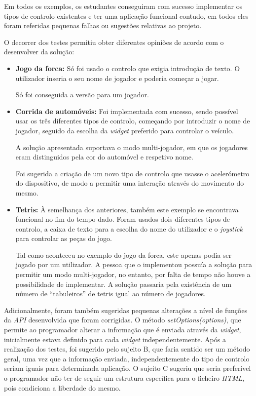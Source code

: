 	Em todos os exemplos, os estudantes conseguiram com sucesso implementar os tipos de controlo existentes e ter uma aplicação funcional contudo, em todos eles foram referidas pequenas falhas ou sugestões relativas ao projeto.

	O decorrer dos testes permitiu obter diferentes opiniões de acordo com o desenvolver da solução:

		\begin{itemize}
		\item \textbf{Jogo da forca: } Só foi usado o controlo que exigia introdução de texto. O utilizador inseria o seu nome de jogador e poderia começar a jogar.

		Só foi conseguida a versão para um jogador.

		\item \textbf{Corrida de automóveis: } Foi implementada com sucesso, sendo possível usar os três diferentes tipos de controlo, começando por introduzir o nome de jogador, seguido da escolha da \textit{widget} preferido para controlar o veículo.

		A solução apresentada suportava o modo multi-jogador, em que os jogadores eram distinguidos pela cor do automóvel e respetivo nome.

		Foi sugerida a criação de um novo tipo de controlo que usasse o acelerómetro do dispositivo, de modo a permitir uma interação através do movimento do mesmo.

		\item \textbf{Tetris: } À semelhança dos anteriores, também este exemplo se encontrava funcional no fim do tempo dado. Foram usados dois diferentes tipos de controlo, a caixa de texto para a escolha do nome do utilizador e o \textit{joystick} para controlar as peças do jogo. 

		Tal como aconteceu no exemplo do jogo da forca, este apenas podia ser jogado por um utilizador. A pessoa que o implementou possuía a solução para permitir um modo multi-jogador, no entanto, por falta de tempo não houve a possibilidade de implementar. A solução passaria pela existência de um número de ``tabuleiros'' de tetris igual ao número de jogadores.

		\end{itemize}

	Adicionalmente, foram também sugeridas pequenas alterações a nível de funções da \textit{API} desenvolvida que foram corrigidas. O método \textit{setOptions(options)}, que permite ao programador alterar a informação que é enviada através da \textit{widget}, inicialmente estava definido para cada \textit{widget} independentemente. Após a realização dos testes, foi sugerido pelo sujeito B, que faria sentido ser um método geral, uma vez que a informação enviada, independentemente do tipo de controlo seriam iguais para determinada aplicação.
	O sujeito C sugeriu que seria preferível o programador não ter de seguir um estrutura específica para o ficheiro \textit{HTML}, pois condiciona a liberdade do mesmo. 

